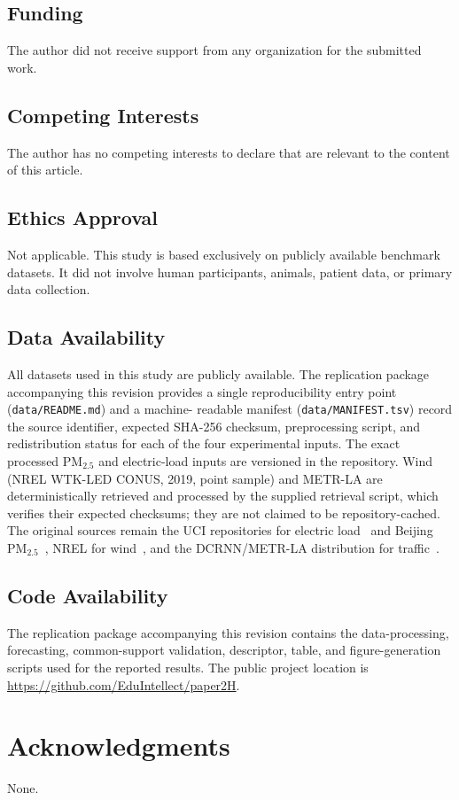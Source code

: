\documentclass[pdflatex]{sn-jnl}
\begin{document}
\subsection*{Funding}
The author did not receive support from any organization for the submitted work.

\subsection*{Competing Interests}
The author has no competing interests to declare that are relevant to the content of this article.

\subsection*{Ethics Approval}
Not applicable. This study is based exclusively on publicly available benchmark datasets. It did not involve human participants, animals, patient data, or primary data collection.

\subsection*{Data Availability}
All datasets used in this study are publicly available. The replication package
accompanying this revision provides a single reproducibility entry point
(\texttt{data/README.md}) and a machine-
readable manifest (\texttt{data/MANIFEST.tsv}) record the source identifier,
expected SHA-256 checksum, preprocessing script, and redistribution status for
each of the four experimental inputs. The exact processed PM$_{2.5}$ and
electric-load inputs are versioned in the repository. Wind (NREL WTK-LED CONUS,
2019, point sample) and METR-LA are deterministically retrieved and processed by
the supplied retrieval script, which verifies their expected checksums; they are
not claimed to be repository-cached. The original sources remain the UCI
repositories for electric load~\citep{trindade2015} and Beijing
PM$_{2.5}$~\citep{chen2015beijingpm25}, NREL for wind~\citep{draxl2015}, and
the DCRNN/METR-LA distribution for traffic~\citep{li2018dcrnn}.

\subsection*{Code Availability}
The replication package accompanying this revision contains the data-processing,
forecasting, common-support validation, descriptor, table, and figure-generation
scripts used for the reported results. The public project location is
\url{https://github.com/EduIntellect/paper2H}.

\section*{Acknowledgments}
None.




\end{document}
